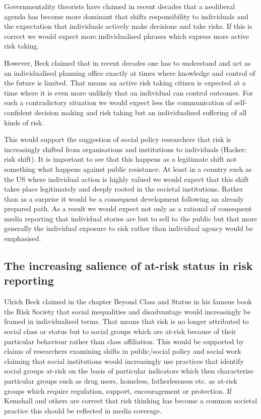 Governmentality theorists have claimed in recent decades that a neoliberal agenda has become more dominant that shifts responsibility to individuals and the expectation that individuals actively make decisions and take risks. If this is correct we would expect more individualised phrases which express more active risk taking. 

However, Beck claimed that in recent decades one has to understand and act as an individualised planning office exactly at times where knowledge and control of the future is limited. That means an active risk taking citizen is expected at a time where it is even more unlikely that an individual can control outcomes. For such a contradictory situation we would expect less the communication of self-confident decision making and risk taking but an individualised suffering of all kinds of risk. 

This would support the suggestion of social policy researchers that risk is increasingly shifted from organisations and institutions to individuals (Hacker: risk shift). It is important to see that this happens as a legitimate shift not something what happens against public resistance. At least in a country such as the US where individual action is highly valued we would expect that this shift takes place legitimately and deeply rooted in the societal institutions. Rather than as a surprise it would be a consequent development following an already prepared path. As a result we would expect not only as a rational of consequent media reporting that individual stories are but to sell to the public but that more generally the individual exposure to risk rather than individual agency would be emphasised. 

\subsection*{The increasing salience of at-risk status in risk reporting}

Ulrich Beck claimed in the chapter Beyond Class and Status in his famous book the Risk Society that social inequalities and disadvantage would increasingly be framed in individualised terms. That means that risk is no longer attributed to social class or status but to social groups which are at-risk because of their particular behaviour rather than class affiliation. 
This would be supported by claims of researchers examining shifts in public\slash social policy and social work claiming that social institutions would increasingly use practices that identify social groups at-risk on the basis of particular indicators which then characterise particular groups such as drug users, homeless, fatherlessness etc. as at-risk groups which require regulation, support, encouragement or protection. If Kemshall and others are correct that risk thinking has become a common societal practice this should be reflected in media coverage.

